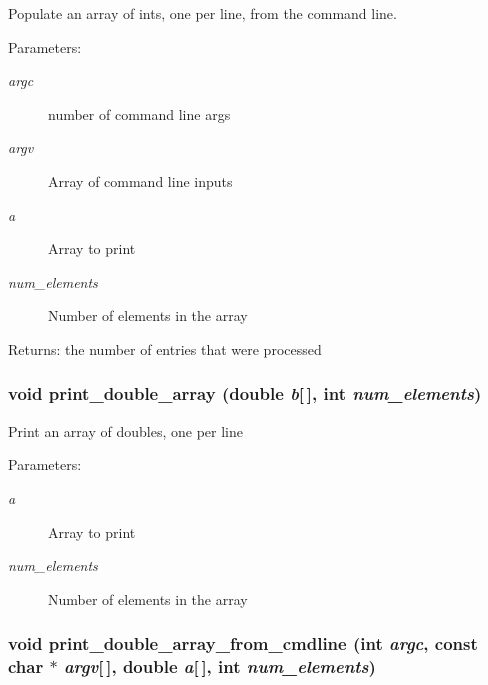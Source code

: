 Populate an array of ints, one per line, from the command line. \begin{Desc}
\item[Parameters:]
\begin{description}
\item[{\em argc}]number of command line args \item[{\em argv}]Array of command line inputs \item[{\em a}]Array to print \item[{\em num\_\-elements}]Number of elements in the array \end{description}
\end{Desc}
\begin{Desc}
\item[Returns:]the number of entries that were processed \end{Desc}
\subsubsection{\setlength{\rightskip}{0pt plus 5cm}void print\_\-double\_\-array (double {\em b}[$\,$], int {\em num\_\-elements})}\label{print__arrays_8c_ace85596af8d3267be95256b7536d232}


Print an array of doubles, one per line \begin{Desc}
\item[Parameters:]
\begin{description}
\item[{\em a}]Array to print \item[{\em num\_\-elements}]Number of elements in the array \end{description}
\end{Desc}
\subsubsection{\setlength{\rightskip}{0pt plus 5cm}void print\_\-double\_\-array\_\-from\_\-cmdline (int {\em argc}, const char $\ast$ {\em argv}[$\,$], double {\em a}[$\,$], int {\em num\_\-elements})}\label{print__arrays_8c_fb163ef3d770961b9d8f159528e9f732}


